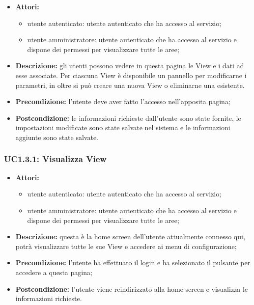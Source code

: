 \begin{itemize}
    \item \textbf{Attori:}
    \begin{itemize}
    	\item utente autenticato: utente autenticato che ha accesso al servizio;
    	\item utente amministratore: utente autenticato che ha accesso al servizio e dispone dei permessi per visualizzare tutte le aree;
	\end{itemize}
	 \item \textbf{Descrizione:} gli utenti possono vedere in questa pagina le View e i dati ad esse associate. Per ciascuna View è disponibile un pannello per modificarne i parametri, in oltre si può creare una nuova View o eliminarne una esistente.
    \item \textbf{Precondizione:} l'utente deve aver fatto l'accesso nell'apposita pagina;
    \item \textbf{Postcondizione:} le informazioni richieste dall'utente sono state fornite, le impostazioni modificate sono state salvate nel sistema e le informazioni aggiunte sono state salvate.
\end{itemize}

\subsubsection{UC1.3.1: Visualizza View}

\begin{itemize}
    \item \textbf{Attori:}
    \begin{itemize}
    	\item utente autenticato: utente autenticato che ha accesso al servizio;
    	\item utente amministratore: utente autenticato che ha accesso al servizio e dispone dei permessi per visualizzare tutte le aree;
	\end{itemize}
    \item \textbf{Descrizione:} questa è la home screen dell'utente attualmente connesso qui, potrà visualizzare tutte le sue View e accedere ai menu di configurazione;
    \item \textbf{Precondizione:} l'utente ha effettuato il login e ha selezionato il pulsante per accedere a questa pagina;
    \item \textbf{Postcondizione:} l'utente viene reindirizzato alla home screen e visualizza le informazioni richieste.
\end{itemize}

